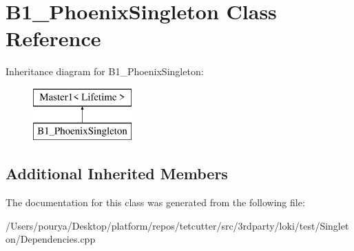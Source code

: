 \hypertarget{classB1__PhoenixSingleton}{}\section{B1\+\_\+\+Phoenix\+Singleton Class Reference}
\label{classB1__PhoenixSingleton}
Inheritance diagram for B1\+\_\+\+Phoenix\+Singleton\+:\begin{figure}[H]
\begin{center}
\leavevmode
\includegraphics[height=2.000000cm]{classB1__PhoenixSingleton}
\end{center}
\end{figure}
\subsection*{Additional Inherited Members}


The documentation for this class was generated from the following file\+:\begin{DoxyCompactItemize}
\item 
/\+Users/pourya/\+Desktop/platform/repos/tetcutter/src/3rdparty/loki/test/\+Singleton/Dependencies.\+cpp\end{DoxyCompactItemize}
